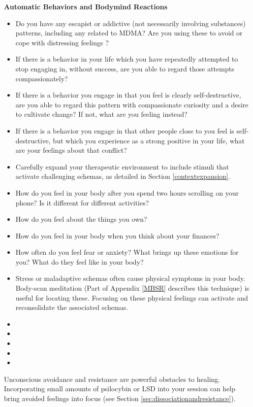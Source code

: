 \documentclass[12pt,letterpaper]{book}
\begin{document}
\noindent \textbf{Automatic Behaviors and Bodymind Reactions}
\begin{itemize}
    \item Do you have any escapist or addictive (not necessarily involving substances) patterns, including any related to MDMA? Are you using these to avoid or cope with distressing feelings \cite{forsterTraumaAddiction,alaviBehavioralAddiction}?
    \item If there is a behavior in your life which you have repeatedly attempted to stop engaging in, without success, are you able to regard those attempts compassionately?
    \item If there is a behavior you engage in that you feel is clearly self-destructive, are you able to regard this pattern with compassionate curiosity and a desire to cultivate change? If not, what are you feeling instead?
    \item If there is a behavior you engage in that other people close to you feel is self-destructive, but which you experience as a strong positive in your life, what are your feelings about that conflict?
    \item Carefully expand your therapeutic environment to include stimuli that activate challenging schemas, as detailed in Section \ref{contextexpansion}.
    \item How do you feel in your body after you spend two hours scrolling on your phone? Is it different for different activities?
    \item How do you feel about the things you own?
    \item How do you feel in your body when you think about your finances?
    \item How often do you feel fear or anxiety? What brings up these emotions for you? What do they feel like in your body?
    \item Stress or maladaptive schemas often cause physical symptoms in your body. Body-scan meditation (Part of Appendix \ref{MBSR} describes this technique) is useful for locating these. Focusing on these physical feelings can activate and reconsolidate the associated schemas.
\end{itemize}

\begin{itemize}
    \item {}
    \item {}
    \item {}
    \item {}
    \item {}
\end{itemize}
Unconscious avoidance and resistance are powerful obstacles to healing. Incorporating small amounts of psilocybin or LSD into your session can help bring avoided feelings into focus (see Section \ref{sec:dissociationandresistance}). 
\end{document}
